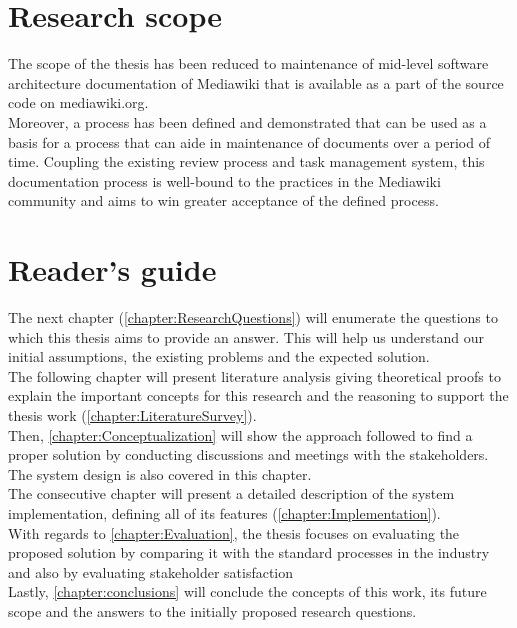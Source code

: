 \section{Research scope}\label{sec:scope}
The scope of the thesis has been reduced to maintenance of mid-level software architecture documentation of Mediawiki that is available as a part of the source code on mediawiki.org.
\\\indent Moreover, a process has been defined and demonstrated that can be used as a basis for a process that can aide in maintenance of documents over a period of time. Coupling the existing review process and task management system, this documentation process is well-bound to the practices in the Mediawiki community and aims to win greater acceptance of the defined process.

\section{Reader's guide}\label{sec:guide}
\indent The next chapter (\autoref{chapter:ResearchQuestions}) will enumerate the questions to which this thesis aims to provide an answer. This will help us understand our initial assumptions, the existing problems and the expected solution.
\\\indent The following chapter will present literature analysis giving theoretical proofs to explain the important concepts for this research and the reasoning to support the thesis work (\autoref{chapter:LiteratureSurvey}).
\\\indent Then, \autoref{chapter:Conceptualization} will show the approach followed to find a proper solution by conducting discussions and meetings with the stakeholders. The system design is also covered in this chapter. 
\\\indent The consecutive chapter will present a detailed description of the system implementation, defining all of its features (\autoref{chapter:Implementation}).
\\\indent With regards to \autoref{chapter:Evaluation}, the thesis focuses on evaluating the proposed solution by comparing it with the standard processes in the industry and also by evaluating stakeholder satisfaction
\\\indent Lastly, \autoref{chapter:conclusions} will conclude the concepts of this work, its future scope and the answers to the initially proposed research questions.


